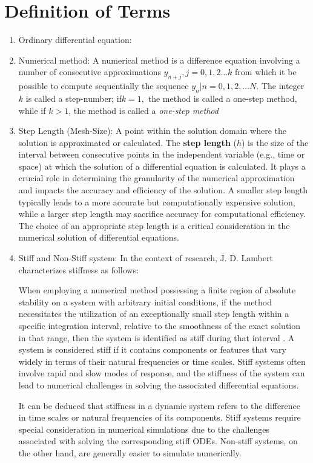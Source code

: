 \section{Definition of Terms}
\begin{enumerate}
  \item Ordinary differential equation:
  \item Numerical method: A numerical method is a difference equation involving a number of consecutive approximations $y_{n+j}, j = 0,1,2 \dots k$ from which it be possible to compute sequentially the sequence ${y_{n}|n = 0,1,2, \dots N}$. The integer $k$ is called a step-number; if$k=1,$ the method is called a one-step method, while if $k>1$, the method is called a \textit{one-step method}
  \item Step Length (Mesh-Size): A point within the solution domain where the solution is approximated or calculated. The \textbf{step length} (\(h\)) is the size of the interval between consecutive points in the independent variable (e.g., time or space) at which the solution of a differential equation is calculated. It plays a crucial role in determining the granularity of the numerical approximation and impacts the accuracy and efficiency of the solution. A smaller step length typically leads to a more accurate but computationally expensive solution, while a larger step length may sacrifice accuracy for computational efficiency. The choice of an appropriate step length is a critical consideration in the numerical solution of differential equations.
  \item Stiff and Non-Stiff system: 
  In the context of research, J. D. Lambert characterizes stiffness as follows:

  When employing a numerical method possessing a finite region of absolute stability on a system with arbitrary initial conditions, if the method necessitates the utilization of an exceptionally small step length within a specific integration interval, relative to the smoothness of the exact solution in that range, then the system is identified as stiff during that interval \cite{lambert1977}.
  A system is considered stiff if it contains components or features that vary widely in terms of their natural frequencies or time scales. Stiff systems often involve rapid and slow modes of response, and the stiffness of the system can lead to numerical challenges in solving the associated differential equations.


  It can be deduced that stiffness in a dynamic system refers to the difference in time scales or natural frequencies of its components. Stiff systems require special consideration in numerical simulations due to the challenges associated with solving the corresponding stiff ODEs. Non-stiff systems, on the other hand, are generally easier to simulate numerically.


\end{enumerate}
